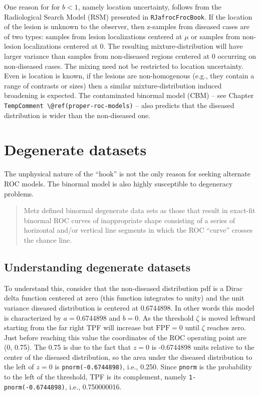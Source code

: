 \documentclass[
]{book}
\begin{document}
One reason for for \(b < 1\), namely location uncertainty, follows from the Radiological Search Model (RSM) presented in \texttt{RJafrocFrocBook}. If the location of the lesion is unknown to the observer, then z-samples from diseased cases are of two types: samples from lesion localizations centered at \(\mu\) or samples from non-lesion localizations centered at 0. The resulting mixture-distribution will have larger variance than samples from non-diseased regions centered at 0 occurring on non-diseased cases. The mixing need not be restricted to location uncertainty. Even is location is known, if the lesions are non-homogenous (e.g., they contain a range of contrasts or sizes) then a similar mixture-distribution induced broadening is expected. The contaminated binormal model (CBM) -- see Chapter \texttt{TempComment\ \textbackslash{}@ref(proper-roc-models)} -- also predicts that the diseased distribution is wider than the non-diseased one.

\hypertarget{binormal-model-degeneracy}{%
\section{Degenerate datasets}\label{binormal-model-degeneracy}}

The unphysical nature of the ``hook'' is not the only reason for seeking alternate ROC models. The binormal model is also highly susceptible to degeneracy problems.

\begin{quote}
Metz defined binormal degenerate data sets as those that result in exact-fit binormal ROC curves of inappropriate shape consisting of a series of horizontal and/or vertical line segments in which the ROC ``curve'' crosses the chance line.
\end{quote}

\hypertarget{binormal-model-understanding-degenerate-datasets}{%
\subsection{Understanding degenerate datasets}\label{binormal-model-understanding-degenerate-datasets}}

To understand this, consider that the non-diseased distribution pdf is a Dirac delta function centered at zero (this function integrates to unity) and the unit variance diseased distribution is centered at 0.6744898. In other words this model is characterized by \(a = 0.6744898\) and \(b = 0\). As the threshold \(\zeta\) is moved leftward starting from the far right TPF will increase but \(\text{FPF}=0\) until \(\zeta\) reaches zero. Just before reaching this value the coordinates of the ROC operating point are (0, 0.75). The 0.75 is due to the fact that \(z = 0\) is -0.6744898 units relative to the center of the diseased distribution, so the area under the diseased distribution to the left of \(z = 0\) is \texttt{pnorm(-0.6744898)}, i.e., 0.250. Since \texttt{pnorm} is the probability to the left of the threshold, TPF is its complement, namely \texttt{1-pnorm(-0.6744898)}, i.e., 0.750000016.
\end{document}
